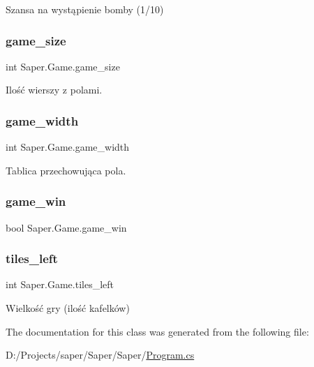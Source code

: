 Szansa na wystąpienie bomby (1/10) 

\mbox{\label{class_saper_1_1_game_a784f5ee2db8e065581bea6885af146a9}} 
\subsubsection{\texorpdfstring{game\_size}{game\_size}}
{\footnotesize\ttfamily int Saper.\+Game.\+game\+\_\+size}



Ilość wierszy z polami. 

\mbox{\label{class_saper_1_1_game_ac555ca6b549cd5db36344c44d30f628d}} 
\subsubsection{\texorpdfstring{game\_width}{game\_width}}
{\footnotesize\ttfamily int Saper.\+Game.\+game\+\_\+width}



Tablica przechowująca pola. 

\mbox{\label{class_saper_1_1_game_a9cfb62bd4e52323d17b9a4f4b58f8a4f}} 
\subsubsection{\texorpdfstring{game\_win}{game\_win}}
{\footnotesize\ttfamily bool Saper.\+Game.\+game\+\_\+win}

\mbox{\label{class_saper_1_1_game_a3acb80304c24bc43f5002d3ce578e7b9}} 
\subsubsection{\texorpdfstring{tiles\_left}{tiles\_left}}
{\footnotesize\ttfamily int Saper.\+Game.\+tiles\+\_\+left}



Wielkość gry (ilość kafelków) 



The documentation for this class was generated from the following file\+:\begin{DoxyCompactItemize}
\item 
D\+:/\+Projects/saper/\+Saper/\+Saper/\mbox{\hyperlink{_program_8cs}{Program.\+cs}}\end{DoxyCompactItemize}
